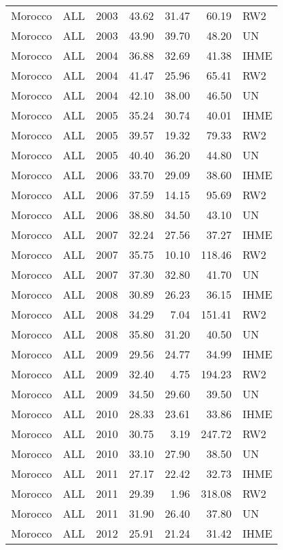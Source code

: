 \begin{longtable}{lllrrrl}
  Morocco & ALL & 2003 & 43.62 & 31.47 & 60.19 & RW2 \\ 
  Morocco & ALL & 2003 & 43.90 & 39.70 & 48.20 & UN \\ 
  Morocco & ALL & 2004 & 36.88 & 32.69 & 41.38 & IHME \\ 
  Morocco & ALL & 2004 & 41.47 & 25.96 & 65.41 & RW2 \\ 
  Morocco & ALL & 2004 & 42.10 & 38.00 & 46.50 & UN \\ 
  Morocco & ALL & 2005 & 35.24 & 30.74 & 40.01 & IHME \\ 
  Morocco & ALL & 2005 & 39.57 & 19.32 & 79.33 & RW2 \\ 
  Morocco & ALL & 2005 & 40.40 & 36.20 & 44.80 & UN \\ 
  Morocco & ALL & 2006 & 33.70 & 29.09 & 38.60 & IHME \\ 
  Morocco & ALL & 2006 & 37.59 & 14.15 & 95.69 & RW2 \\ 
  Morocco & ALL & 2006 & 38.80 & 34.50 & 43.10 & UN \\ 
  Morocco & ALL & 2007 & 32.24 & 27.56 & 37.27 & IHME \\ 
  Morocco & ALL & 2007 & 35.75 & 10.10 & 118.46 & RW2 \\ 
  Morocco & ALL & 2007 & 37.30 & 32.80 & 41.70 & UN \\ 
  Morocco & ALL & 2008 & 30.89 & 26.23 & 36.15 & IHME \\ 
  Morocco & ALL & 2008 & 34.29 & 7.04 & 151.41 & RW2 \\ 
  Morocco & ALL & 2008 & 35.80 & 31.20 & 40.50 & UN \\ 
  Morocco & ALL & 2009 & 29.56 & 24.77 & 34.99 & IHME \\ 
  Morocco & ALL & 2009 & 32.40 & 4.75 & 194.23 & RW2 \\ 
  Morocco & ALL & 2009 & 34.50 & 29.60 & 39.50 & UN \\ 
  Morocco & ALL & 2010 & 28.33 & 23.61 & 33.86 & IHME \\ 
  Morocco & ALL & 2010 & 30.75 & 3.19 & 247.72 & RW2 \\ 
  Morocco & ALL & 2010 & 33.10 & 27.90 & 38.50 & UN \\ 
  Morocco & ALL & 2011 & 27.17 & 22.42 & 32.73 & IHME \\ 
  Morocco & ALL & 2011 & 29.39 & 1.96 & 318.08 & RW2 \\ 
  Morocco & ALL & 2011 & 31.90 & 26.40 & 37.80 & UN \\ 
  Morocco & ALL & 2012 & 25.91 & 21.24 & 31.42 & IHME \\ 

\end{longtable}
